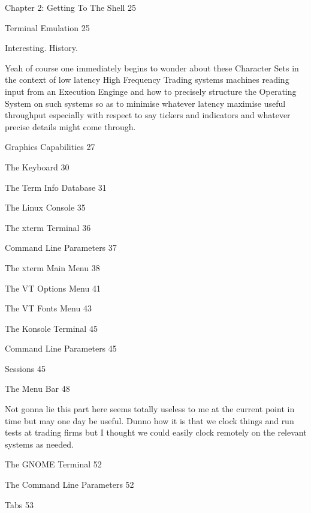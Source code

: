 Chapter 2: Getting To The Shell 25



Terminal Emulation 25

Interesting. History.

Yeah of course one immediately begins to wonder about these Character Sets in the context of low latency High Frequency Trading systems machines reading input from an Execution Enginge and how to precisely structure the Operating System on such systems so as to minimise whatever latency maximise useful throughput especially with respect to say tickers and indicators and whatever precise details might come through.

Graphics Capabilities 27



The Keyboard 30



The Term Info Database 31



The Linux Console 35



The xterm Terminal 36



Command Line Parameters 37



The xterm Main Menu 38



The VT Options Menu 41



The VT Fonts Menu 43



The Konsole Terminal 45



Command Line Parameters 45



Sessions 45



The Menu Bar 48

Not gonna lie this part here seems totally useless to me at the current point in time but may one day be useful. Dunno how it is that we clock things and run tests at trading firms but I thought we could easily clock remotely on the relevant systems as needed.

The GNOME Terminal 52



The Command Line Parameters 52



Tabs 53



